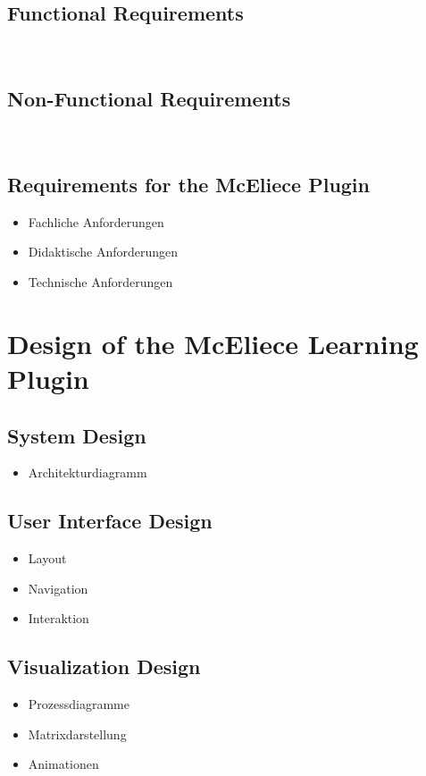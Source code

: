 \documentclass[a4paper,11pt]{article}
\begin{document}
\subsection{Functional Requirements}
\ %

\subsection{Non-Functional Requirements}
\ %

\subsection{Requirements for the McEliece Plugin}
\begin{itemize}
	\item Fachliche Anforderungen
	\item Didaktische Anforderungen
	\item Technische Anforderungen
\end{itemize}

\section{Design of the McEliece Learning Plugin}

\subsection{System Design}
\begin{itemize}
	\item Architekturdiagramm
\end{itemize}

\subsection{User Interface Design}
\begin{itemize}
	\item Layout
	\item Navigation
	\item Interaktion
\end{itemize}

\subsection{Visualization Design}
\begin{itemize}
	\item Prozessdiagramme
	\item Matrixdarstellung
	\item Animationen
\end{itemize}
\end{document}
